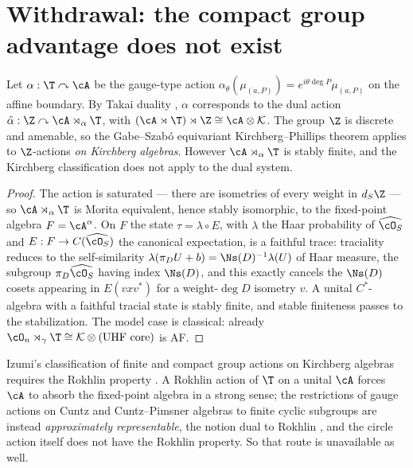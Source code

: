 \section{Withdrawal: the compact group advantage does not exist}

\begin{proposition}\label{XVIII:prop:takai}
Let $\alpha:\T\curvearrowright\cA$ be the gauge-type action
$\alpha_\theta(\mu_{(a,P)})=e^{i\theta\deg P}\mu_{(a,P)}$ on the affine boundary. By Takai
duality \cite{Takai}, $\alpha$
corresponds to the dual action $\hat\alpha:\Z\curvearrowright\cA\rtimes_\alpha\T$, with
$(\cA\rtimes\T)\rtimes\Z\cong\cA\otimes\mathcal K$. The group $\Z$ is discrete and amenable,
so the Gabe--Szab\'o equivariant Kirchberg--Phillips theorem \cite{GabeSzabo} applies to
$\Z$-actions \emph{on Kirchberg algebras}. However $\cA\rtimes_\alpha\T$ is stably finite,
and the Kirchberg classification does not apply to the dual system.
\end{proposition}

\begin{proof}
The action is saturated --- there are isometries of every weight in $d_S\Z$ --- so
$\cA\rtimes_\alpha\T$ is Morita equivalent, hence stably isomorphic, to the fixed-point
algebra $F=\cA^\alpha$. On $F$ the state $\tau=\lambda\circ E$, with $\lambda$ the Haar
probability of $\widehat{\cO_S}$ and $E:F\to C(\widehat{\cO_S})$ the canonical expectation,
is a faithful trace: traciality reduces to the self-similarity
$\lambda(\pi_DU+b)=\Ns(D)^{-1}\lambda(U)$ of Haar measure, the subgroup
$\pi_D\widehat{\cO_S}$ having index $\Ns(D)$, and this exactly cancels the
$\Ns(D)$ cosets appearing in $E(vxv^*)$ for a weight-$\deg D$ isometry $v$. A unital
$C^*$-algebra with a faithful tracial state is stably finite, and stable finiteness passes
to the stabilization. The model case is classical: already
$\cO_n\rtimes_\gamma\T\cong\mathcal K\otimes(\text{UHF core})$ is AF.
\end{proof}

\begin{proposition}\label{XVIII:prop:notrokhlin}
Izumi's classification of finite and compact group actions on Kirchberg algebras requires the
Rokhlin property \cite{Izumi}. A Rokhlin action of $\T$ on a unital $\cA$ forces $\cA$ to
absorb the fixed-point algebra in a strong sense; the restrictions of gauge actions on Cuntz
and Cuntz--Pimsner algebras to finite cyclic subgroups are instead \emph{approximately
representable}, the notion dual to Rokhlin \cite{Izumi}, and the circle action itself does
not have the Rokhlin property. So that route is unavailable as well.
\end{proposition}

